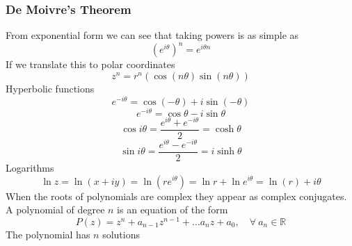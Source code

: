 \documentclass[11pt,titlepage]{article}
\numberwithin{equation}{subsection}
\begin{document}
\subsubsection{De Moivre's Theorem}
From exponential form we can see that taking powers is as simple as
\begin{equation}
    (e^{i\theta})^n=e^{i\theta n}
\end{equation}
If we translate this to polar coordinates
\begin{equation}
    z^n=r^n(\cos(n\theta)\sin(n\theta))
\end{equation}
Hyperbolic functions
\begin{equation}
    e^{-i\theta}=\cos(-\theta)+i\sin(-\theta)
\end{equation}
\begin{equation}
    e^{-i\theta}=\cos \theta-i\sin \theta
\end{equation}
\begin{equation}
    \cos i\theta=\frac{e^{i\theta}+{e^{-i\theta}}}{2}=\cosh \theta
\end{equation}
\begin{equation}
    \sin i\theta=\frac{e^{i\theta}-e^{-i\theta}}{2}=i\sinh \theta
\end{equation}
Logarithms
\begin{equation}
    \ln z=\ln(x+iy)=\ln(re^{i\theta})=\ln r +\ln e^{i\theta}=\ln (r)+i\theta
\end{equation}
When the roots of polynomials are complex they appear as complex conjugates. A polynomial of degree $n$ is an equation of the form
\begin{equation}
    P(z)=z^n+a_{n-1}z^{n-1}+\dots a_{n}z+a_{0},\quad\forall \ a_{n} \in \mathbb R
\end{equation}
The polynomial has $n$ solutions
\end{document}
